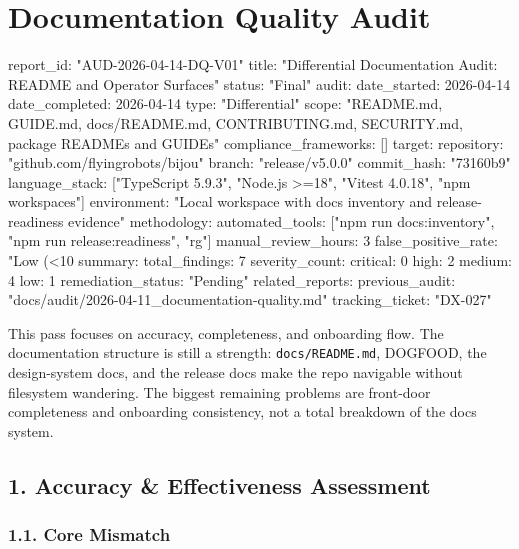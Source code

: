 \chapter{Documentation Quality Audit}\label{record-417}

\smallskip

\begin{RecordMeta}
report_id: "AUD-2026-04-14-DQ-V01"
title: "Differential Documentation Audit: README and Operator Surfaces"
status: "Final"
audit:
  date_started: 2026-04-14
  date_completed: 2026-04-14
  type: "Differential"
  scope: "README.md, GUIDE.md, docs/README.md, CONTRIBUTING.md, SECURITY.md, package READMEs and GUIDEs"
  compliance_frameworks: []
target:
  repository: "github.com/flyingrobots/bijou"
  branch: "release/v5.0.0"
  commit_hash: "73160b9"
  language_stack: ["TypeScript 5.9.3", "Node.js >=18", "Vitest 4.0.18", "npm workspaces"]
  environment: "Local workspace with docs inventory and release-readiness evidence"
methodology:
  automated_tools: ["npm run docs:inventory", "npm run release:readiness", "rg"]
  manual_review_hours: 3
  false_positive_rate: "Low (<10%
summary:
  total_findings: 7
  severity_count:
    critical: 0
    high: 2
    medium: 4
    low: 1
  remediation_status: "Pending"
related_reports:
  previous_audit: "docs/audit/2026-04-11_documentation-quality.md"
  tracking_ticket: "DX-027"

\end{RecordMeta}

This pass focuses on accuracy, completeness, and onboarding flow. The documentation structure is still a strength: \texttt{d\allowbreak{}o\allowbreak{}c\allowbreak{}s\allowbreak{}/\allowbreak{}R\allowbreak{}E\allowbreak{}A\allowbreak{}D\allowbreak{}M\allowbreak{}E\allowbreak{}.\allowbreak{}m\allowbreak{}d}, DOGFOOD, the design-system docs, and the release docs make the repo navigable without filesystem wandering. The biggest remaining problems are front-door completeness and onboarding consistency, not a total breakdown of the docs system.

\section{1. Accuracy \& Effectiveness Assessment}\label{record-417-accuracy-effectiveness-assessment}

\subsection{1.1. Core Mismatch}\label{record-417-core-mismatch}

